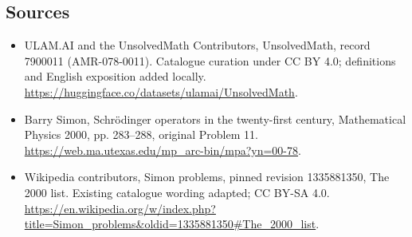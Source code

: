\documentclass[11pt]{article}
\begin{document}
\subsection{Sources}
\begin{itemize}
\item[\hypertarget{source:7900011:1}{S1}] ULAM.AI and the UnsolvedMath Contributors, UnsolvedMath, record 7900011 (AMR-078-0011). Catalogue curation under CC BY 4.0; definitions and English exposition added locally.
\url{https://huggingface.co/datasets/ulamai/UnsolvedMath}.
\item[\hypertarget{source:7900011:2}{S2}] Barry Simon, Schrödinger operators in the twenty-first century, Mathematical Physics 2000, pp. 283–288, original Problem 11.
\url{https://web.ma.utexas.edu/mp_arc-bin/mpa?yn=00-78}.
\item[\hypertarget{source:7900011:3}{S3}] Wikipedia contributors, Simon problems, pinned revision 1335881350, The 2000 list. Existing catalogue wording adapted; CC BY-SA 4.0.
\url{https://en.wikipedia.org/w/index.php?title=Simon_problems&oldid=1335881350#The_2000_list}.
\end{itemize}
\label{end:7900011}
\end{document}

